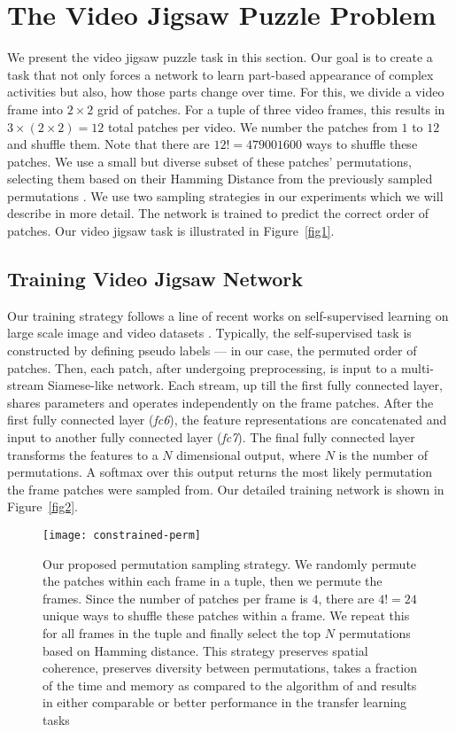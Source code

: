 \documentclass[10pt,twocolumn,letterpaper]{article}
\begin{document}
\section{The Video Jigsaw Puzzle Problem}\label{sec-train}
We present the video jigsaw puzzle task in this section. Our goal is to create a task that not only forces a network to learn part-based appearance of complex activities but also, how those parts change over time. For this, we divide a video frame into $2 \times 2$ grid of patches. For a tuple of three video frames, this results in $3 \times (2 \times 2) = 12$ total patches per video. We number the patches from $1$ to $12$ and shuffle them. Note that there are $12! = 479001600$ ways to shuffle these patches. We use a small but diverse subset of these patches' permutations, selecting them based on their Hamming Distance from the previously sampled permutations \cite{noroozi2016unsupervised}. We use two sampling strategies in our experiments which we will describe in more detail. The network is trained to predict the correct order of patches. Our video jigsaw task is illustrated in Figure~\ref{fig1}. 

\subsection{Training Video Jigsaw Network}
Our training strategy follows a line of recent works on self-supervised learning on large scale image and video datasets \cite{noroozi2016unsupervised,lee2017unsupervised}. Typically, the self-supervised task is constructed by defining pseudo labels --- in our case, the permuted order of patches. Then, each patch, after undergoing preprocessing, is input to a multi-stream Siamese-like network. Each stream, up till the first fully connected layer, shares parameters and operates independently on the frame patches. After the first fully connected layer (\textit{fc6}), the feature representations are concatenated and input to another fully connected layer (\textit{fc7}). The final fully connected layer transforms the features to a $N$ dimensional output, where $N$ is the number of permutations. A softmax over this output returns the most likely permutation the frame patches were sampled from. Our detailed training network is shown in Figure~\ref{fig2}.

\begin{figure*}[t]
\centering
\texttt{[image: constrained-perm]}
\caption{Our proposed permutation sampling strategy. We randomly permute the patches within each frame in a tuple, then we permute the frames. Since the number of patches per frame is $4$, there are $4! = 24$ unique ways to shuffle these patches within a frame. We repeat this for all frames in the tuple and finally select the top $N$ permutations based on Hamming distance. This strategy preserves spatial coherence, preserves diversity between permutations, takes a fraction of the time and memory as compared to the algorithm of \cite{noroozi2016unsupervised} and results in either comparable or better performance in the transfer learning tasks}
\label{fig3}
\end{figure*}
\end{document}
